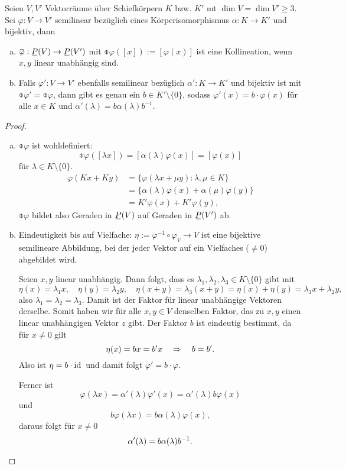 \begin{thm}
 Seien $V, V'$ Vektorräume über Schiefkörpern $K$ bzw. $K'$ mt $\dim V = \dim V' \ge 3$. Sei $\varphi : V \to V'$ semilinear bezüglich eines Körperisomorphismus $\alpha: K \to K'$ und bijektiv, dann
 \begin{enumerate}[a)]
  \item $\obar{\varphi} : \proj(V) \to \proj(V')$ mit $\obar{\varphi}( [x] ) := [\varphi(x)]$ ist eine Kollineation\footnotemark, wenn $x, y$ linear unabhängig sind.
  \item Falls $\varphi': V \to V'$ ebenfalls semilinear bezüglich $\alpha': K \to K'$ und bijektiv ist mit $\obar{\varphi}' = \obar{\varphi}$, dann gibt es genau ein $b \in K' \setminus \{ 0 \}$, sodass $\varphi'(x) = b \cdot \varphi(x)$ für alle $x \in K$ und $\alpha'(\lambda) = b \alpha(\lambda) b^{-1}$.
 \end{enumerate}
\end{thm}

\begin{proof}
 \begin{enumerate}[a)]
  \item $\obar{\varphi}$ ist wohldefiniert:
   \[ \obar{\varphi}( [\lambda x] ) = [\alpha(\lambda) \varphi(x) ] = [\varphi(x)] \]
   für $\lambda \in K \setminus \{0\}$.
   \[ \begin{aligned}
      \varphi(Kx + Ky )
      &= \{ \varphi( \lambda x + \mu y) : \lambda, \mu \in K \} \\
      &= \{ \alpha( \lambda ) \varphi(x) + \alpha( \mu ) \varphi(y) \} \\
      &= K' \varphi(x)  + K' \varphi(y),
      \end{aligned} \]
   $\obar{\varphi}$ bildet also Geraden in $\proj(V)$ auf Geraden in $\proj(V')$ ab.
  \item Eindeutigkeit bis auf Vielfache: $\eta := \varphi^{-1} \circ \varphi_ V \to V$ ist eine bijektive semilineare Abbildung, bei der jeder Vektor auf ein Vielfaches ($\ne 0$) abgebildet wird.
  
  Seien $x,y$ linear unabhängig. Dann folgt, dass es $\lambda_1, \lambda_2, \lambda_3 \in K \setminus \{ 0 \}$ gibt mit
  \[ \eta(x) = \lambda_1 x, \quad \eta(y) = \lambda_2 y, \quad \eta(x+y) = \lambda_3 (x+y)  = \eta(x) + \eta(y) = \lambda_1 x + \lambda_2 y, \]
  also $\lambda_1 = \lambda_2 = \lambda_3$. Damit ist der Faktor für linear unabhängige Vektoren derselbe. Somit haben wir für alle $x,y \in V$ denselben Faktor, das zu $x,y$ einen linear unabhängigen Vektor $z$ gibt. Der Faktor $b$ ist eindeutig bestimmt, da für $x \ne 0$ gilt
  \[ \eta(x) = bx = b'x \quad \Rightarrow \quad b = b'. \]
  Also ist $\eta = b \cdot \mathrm{id}\,$ und damit folgt $\varphi' = b \cdot \varphi$.
  
  Ferner ist
  \[ \varphi( \lambda x ) = \alpha'(\lambda) \varphi'(x) = \alpha'(\lambda) b \varphi(x) \]
  und
  \[ b \varphi(\lambda x) = b \alpha(\lambda) \varphi(x), \]
  daraus folgt für $x \ne 0$
  \[ \alpha'(\lambda) = b \alpha( \lambda ) b^{-1}. \qedhere \]
 \end{enumerate}
\end{proof}

